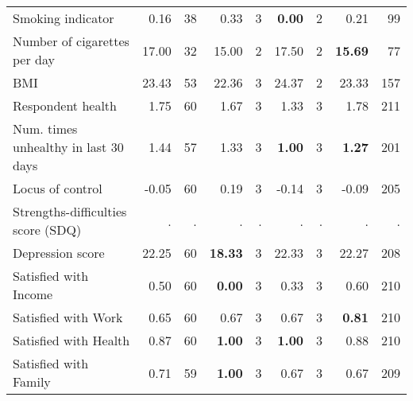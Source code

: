 \begin{tabular}{l r r r r r r r r}
Smoking indicator &      0.16 &        38 &      0.33 &         3 & \textbf{     0.00} &         2 &      0.21 &        99 \\
Number of cigarettes per day &     17.00 &        32 &     15.00 &         2 &     17.50 &         2 & \textbf{    15.69} &        77 \\
BMI &     23.43 &        53 &     22.36 &         3 &     24.37 &         2 &     23.33 &       157 \\
Respondent health &      1.75 &        60 &      1.67 &         3 &      1.33 &         3 &      1.78 &       211 \\
Num. times unhealthy in last 30 days &      1.44 &        57 &      1.33 &         3 & \textbf{     1.00} &         3 & \textbf{     1.27} &       201 \\
Locus of control &     -0.05 &        60 &      0.19 &         3 &     -0.14 &         3 &     -0.09 &       205 \\
Strengths-difficulties score (SDQ) &         . & . &         . & . &         . & . &         . & . \\
Depression score &     22.25 &        60 & \textbf{    18.33} &         3 &     22.33 &         3 &     22.27 &       208 \\
Satisfied with Income &      0.50 &        60 & \textbf{     0.00} &         3 &      0.33 &         3 &      0.60 &       210 \\
Satisfied with Work &      0.65 &        60 &      0.67 &         3 &      0.67 &         3 & \textbf{     0.81} &       210 \\
Satisfied with Health &      0.87 &        60 & \textbf{     1.00} &         3 & \textbf{     1.00} &         3 &      0.88 &       210 \\
Satisfied with Family &      0.71 &        59 & \textbf{     1.00} &         3 &      0.67 &         3 &      0.67 &       209 \\
\bottomrule
\end{tabular}
